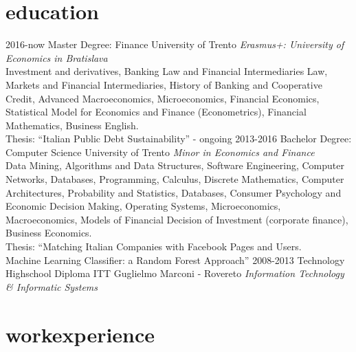 \documentclass[]{friggeri-cv}
\begin{document}
\section{education}

\begin{entrylist}

\entry
    {2016-now}
    {Master Degree: Finance}
    {University of Trento}
    {\emph{Erasmus+: University of Economics in Bratislava}\\
    Investment and derivatives, Banking Law and Financial Intermediaries Law, Markets and Financial Intermediaries, History of Banking and Cooperative Credit, Advanced Macroeconomics, Microeconomics, Financial Economics, Statistical Model for Economics and Finance (Econometrics), Financial Mathematics, Business English.\\
    Thesis: “Italian Public Debt Sustainability” - ongoing
    }
\entry
    {2013-2016}
    {Bachelor Degree: Computer Science}
    {University of Trento}
    {\emph{Minor in Economics and Finance}\\
    Data Mining, Algorithms and Data Structures, Software Engineering, Computer Networks, Databases, Programming, Calculus, Discrete Mathematics, Computer Architectures, Probability and Statistics, Databases, Consumer Psychology and Economic Decision Making, Operating Systems,
    Microeconomics, Macroeconomics, Models of Financial Decision of Investment (corporate finance),
    Business Economics.\\
    Thesis: “Matching Italian Companies with Facebook Pages and Users.\\Machine Learning Classifier: a Random Forest Approach”
    }
\entry
    {2008-2013}
    {Technology Highschool Diploma}
    {ITT Guglielmo Marconi - Rovereto}
    {\emph{Information Technology \& Informatic Systems}}

\end{entrylist}

\section{workexperience}
\end{document}
